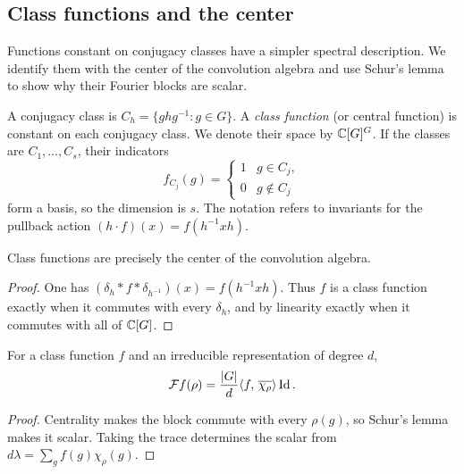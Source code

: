 \subsection{Class functions and the center}
\label{sect2-space-central-functions}

Functions constant on conjugacy classes have a simpler spectral description.
We identify them with the center of the convolution algebra and use Schur's
lemma to show why their Fourier blocks are scalar.

A conjugacy class is $C_h=\{ghg^{-1}:g\in G\}$. A \emph{class function}
(or central function) is constant on each conjugacy class. We denote their
space by $\mathbb{C}[G]^G$. If the classes are $C_1,\ldots,C_s$, their indicators
\begin{equation}
\label{eq-function-char-class}
 f_{C_j}(g)=\begin{cases}1&g\in C_j,\\0&g\notin C_j\end{cases}
\end{equation}
form a basis, so the dimension is $s$. The notation refers to invariants
for the pullback action $(h\cdot f)(x)=f(h^{-1}xh)$.


\begin{prop}
Class functions are precisely the center of the convolution algebra.
\end{prop}
\begin{proof}
One has $(\delta_h*f*\delta_{h^{-1}})(x)=f(h^{-1}xh)$.
Thus $f$ is a class function exactly when it commutes with every $\delta_h$,
and by linearity exactly when it commutes with all of $\mathbb{C}[G]$.
\end{proof}


\begin{lem}
\label{lem-transfo-fourier-homotetie}
For a class function $f$ and an irreducible representation of degree $d$,
\[
 \mathcal{F} f(\rho)=\frac{|G|}{d}\langle f,\,\overline{\chi_\rho}\rangle\operatorname{Id}.
\]
\end{lem}
\begin{proof}
Centrality makes the block commute with every $\rho(g)$, so Schur's
lemma makes it scalar. Taking the trace determines the scalar from
$d\lambda=\sum_g f(g)\chi_\rho(g)$.
\end{proof}

